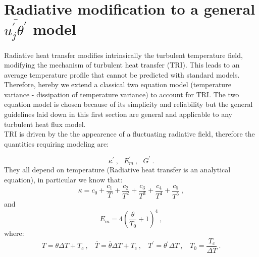 \documentclass[10pt]{article}
\def\lp{\left(}
\def\rp{\right)}
\def\tm{\overline{\theta}}
\def\tr{{\theta^\prime}}
\begin{document}
\section*{Radiative modification to a general $\overline{u_j^\prime \tr}$ model}
\vspace{1cm}
Radiative heat transfer modifies intrinsically the turbulent temperature field, modifying the mechanism of turbulent heat transfer (TRI). This leads to an average temperature profile that cannot be predicted with standard models. Therefore, hereby we extend a classical two equation model (temperature variance - dissipation of temperature variance) to account for TRI. The two equation model is chosen because of its simplicity and reliability but the general guidelines laid down in this first section are general and applicable to any turbulent heat flux model. \\
TRI is driven by the the appearence of a fluctuating radiative field, therefore the quantities requiring modeling are:

\begin{equation*}
\kappa^\prime \ , \ \ \ E_m^\prime \ , \ \ \ G^\prime \ .
\end{equation*}
They all depend on temperature (Radiative heat transfer is an analytical equation), in particular we know that:
\begin{equation*}
\kappa = c_0 + \frac{c_1}{T} + \frac{c_2}{T^2} + \frac{c_3}{T^3} + \frac{c_4}{T^4} + \frac{c_5}{T^5} \ ,
\end{equation*}
and
\begin{equation*}
E_m = 4 {\lp \frac{\theta}{T_0} + 1\rp }^4 \ ,
\end{equation*}
where:
\begin{equation*}
T = \theta \Delta T + T_c \ ,  \ \ \ \ \overline{T} = \tm \Delta T+ T_c \ , \ \ \ \ T^\prime = \tr \Delta T \ , \ \ \ \ T_0 = \frac{T_c}{\Delta T} \ .
\end{equation*}
\end{document}
